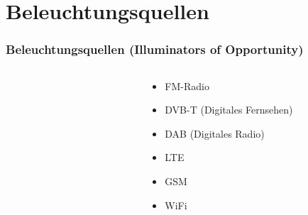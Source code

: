 \section{Beleuchtungsquellen}

\begin{frame}
    \frametitle{Beleuchtungsquellen (Illuminators of Opportunity)}

    \begin{columns}
        \begin{column}{0.2\textwidth}
            \begin{figure}
                \raggedleft{}
            \end{figure}
        \end{column}
        \begin{column}{0.8\textwidth}
            \begin{itemize}
                \item FM-Radio
                \item DVB-T (Digitales Fernsehen)
                \item DAB (Digitales Radio)
                \item LTE
                \item GSM
                \item WiFi
            \end{itemize}
        \end{column}
    \end{columns}
\end{frame}
